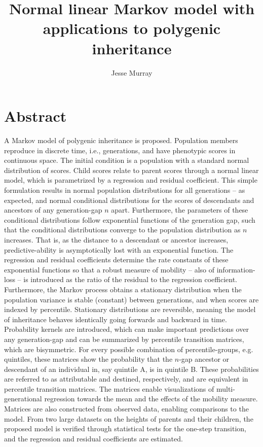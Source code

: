 \documentclass[a4paper,11pt]{article} %
\title{Normal linear Markov model with applications to polygenic inheritance}
\author{Jesse Murray}
\date{}
\begin{document}
\maketitle





\section*{Abstract}
A Markov model of polygenic inheritance is proposed. Population members reproduce in discrete time, i.e., generations, and have phenotypic scores in continuous space. The initial condition is a population with a standard normal distribution of scores. Child scores relate to parent scores through a normal linear model, which is parametrized by a regression and residual coefficient. This simple formulation results in normal population distributions for all generations -- as expected, and normal conditional distributions for the scores of descendants and ancestors of any generation-gap $n$ apart. Furthermore, the parameters of these conditional distributions follow exponential functions of the generation gap, such that the conditional distributions converge to the population distribution as $n$ increases. That is, as the distance to a descendant or ancestor increases, predictive-ability is asymptotically lost with an exponential function. The regression and residual coefficients determine the rate constants of these exponential functions so that a robust measure of mobility -- also of information-loss -- is introduced as the ratio of the residual to the regression coefficient. Furthermore, the Markov process obtains a stationary distribution when the population variance is stable (constant) between generations, and when scores are indexed by percentile. Stationary distributions are reversible, meaning the model of inheritance behaves identically going forwards and backward in time. Probability kernels are introduced, which can make important predictions over any generation-gap and can be summarized by percentile transition matrices, which are bisymmetric. For every possible combination of percentile-groups, e.g. quintiles, these matrices show the probability that the $n$-gap ancestor or descendant of an individual in, say quintile A, is in quintile B. These probabilities are referred to as attributable and destined, respectively, and are equivalent in percentile transition matrices. The matrices enable visualizations of multi-generational regression towards the mean and the effects of the mobility measure. Matrices are also constructed from observed data, enabling comparisons to the model. From two large datasets on the heights of parents and their children, the proposed model is verified through statistical tests for the one-step transition, and the regression and residual coefficients are estimated.
\end{document}
